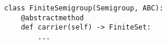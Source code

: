 \par\begin{minipage}{60ex}
\begin{verbatim}
class FiniteSemigroup(Semigroup, ABC):
    @abstractmethod
    def carrier(self) -> FiniteSet:
        ...
\end{verbatim}
\end{minipage}\par